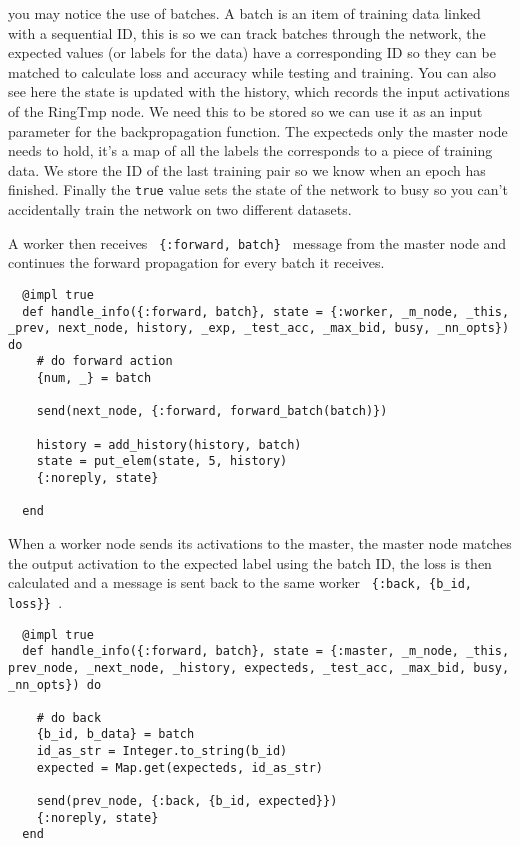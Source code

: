 you may notice the use of batches. A batch is an item of training data linked
with a sequential ID, this is so we can track batches through the network, the
expected values (or labels for the data) have a corresponding ID so they can be
matched to calculate loss and accuracy while testing and training. You can also
see here the state is updated with the history, which records the input
activations of the RingTmp node. We need this to be stored so we can use it as
an input parameter for the backpropagation function. The expecteds only the
master node needs to hold, it's a map of all the labels the corresponds to a
piece of training data. We store the ID of the last training pair so we know
when an epoch has finished. Finally the \lstinline{true} value sets the state of
the network to busy so you can't accidentally train the network on two different
datasets.

A worker then receives \lstinline| {:forward, batch} | message from the master
node and continues the forward propagation for every batch it receives.
\begin{lstlisting}
  @impl true
  def handle_info({:forward, batch}, state = {:worker, _m_node, _this, _prev, next_node, history, _exp, _test_acc, _max_bid, busy, _nn_opts}) do
    # do forward action
    {num, _} = batch

    send(next_node, {:forward, forward_batch(batch)})

    history = add_history(history, batch)
    state = put_elem(state, 5, history)
    {:noreply, state}

  end
\end{lstlisting}

When a worker node sends its activations to the master, the master node matches
the output activation to the expected label using the batch ID, the loss is then
calculated and a message is sent back to the same worker \lstinline| {:back, {b_id, loss}} |.
\begin{lstlisting}
  @impl true
  def handle_info({:forward, batch}, state = {:master, _m_node, _this, prev_node, _next_node, _history, expecteds, _test_acc, _max_bid, busy, _nn_opts}) do

    # do back
    {b_id, b_data} = batch
    id_as_str = Integer.to_string(b_id)
    expected = Map.get(expecteds, id_as_str)

    send(prev_node, {:back, {b_id, expected}})
    {:noreply, state}
  end
\end{lstlisting}

